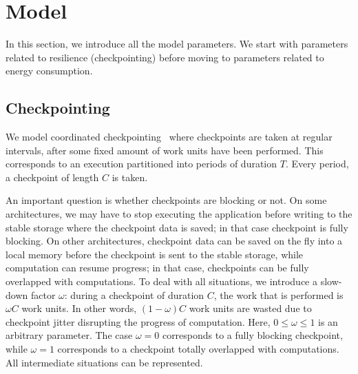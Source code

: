 \documentclass[a4paper]{article}
\newcommand{\ema}[1]{\ensuremath{#1}\xspace}
\newcommand{\ccc}{\ema{C}}
\newcommand{\period}{T}
\newcommand{\workduringckpt}{\omega}
\begin{document}
\section{Model}
\label{sec.model}

In this section, we introduce all the model parameters. We
start with parameters related to resilience (checkpointing)
before moving to parameters related to
energy consumption.

\subsection{Checkpointing}

We model coordinated checkpointing~\cite{CL85} where 
checkpoints are taken at regular intervals, after some fixed amount of
work units have been performed. This corresponds to an 
execution partitioned into periods of duration $\period$. Every period, 
a checkpoint of length $\ccc$ is taken.

An important question is
whether checkpoints are blocking or not.  On some architectures, we
may have to stop executing the application before writing to the
stable storage where the checkpoint data is saved; in that case
checkpoint is fully blocking.  On other architectures, checkpoint data
can be saved on the fly into a local memory before the checkpoint is
sent to the stable storage, while computation can resume progress; in
that case, checkpoints can be fully overlapped with computations.  To
deal with all situations, we introduce a slow-down factor
$\workduringckpt$: during a checkpoint of duration $\ccc$, the work
that is performed is $\workduringckpt \ccc$ work units. In other words,
$(1-\workduringckpt) \ccc$ work units are wasted due to checkpoint
jitter disrupting the progress of computation.  Here, $0 \leq
\workduringckpt \leq 1$ is an arbitrary parameter.  The case
$\workduringckpt =0$ corresponds to a fully blocking checkpoint, while
$\workduringckpt=1$ corresponds to a checkpoint totally overlapped with computations.
All intermediate situations can be represented.
\end{document}
